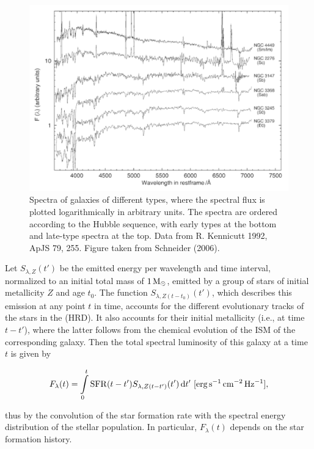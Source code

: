 \documentclass[a4paper,10pt]{article}
\begin{document}
\begin{figure}[t]
    \includegraphics[width=16cm]{figures/StellarSpectra.png}
    \centering
    \caption{\footnotesize{Spectra of galaxies of different types, where the spectral flux is plotted logarithmically in arbitrary units. The spectra are ordered according to the Hubble sequence, with early types at the bottom and late-type spectra at the top. Data from R. Kennicutt 1992, ApJS 79, 255. Figure taken from Schneider (2006).}}
    \label{fig:stellarspectra}
\end{figure}

{\noindent}Let $S_{\lambda,Z}(t')$ be the emitted energy per wavelength and time interval, normalized to an initial total mass of $1\,{\rm M_\odot}$, emitted by a group of stars of initial metallicity $Z$ and age $t_0$. The function $S_{\lambda,Z(t-t_0)}(t')$, which describes this emission at any point $t$ in time, accounts for the different evolutionary tracks of the stars in the (HRD). It also accounts for their initial metallicity (i.e., at time $t-t'$), where the latter follows from the chemical evolution of the ISM of the corresponding galaxy. Then the total spectral luminosity of this galaxy at a time $t$ is given by

\begin{align*}
    F_\lambda(t) = \int\limits_0^t \mathrm{SFR}(t-t')S_{\lambda,Z(t-t')}(t')\,\mathrm{d}t' ~ [{\rm erg\,s^{-1}\,cm^{-2}\,Hz^{-1}}],
\end{align*}

{\noindent}thus by the convolution of the star formation rate with the spectral energy distribution of the stellar population. In particular, $F_\lambda(t)$ depends on the star formation history.
\end{document}
